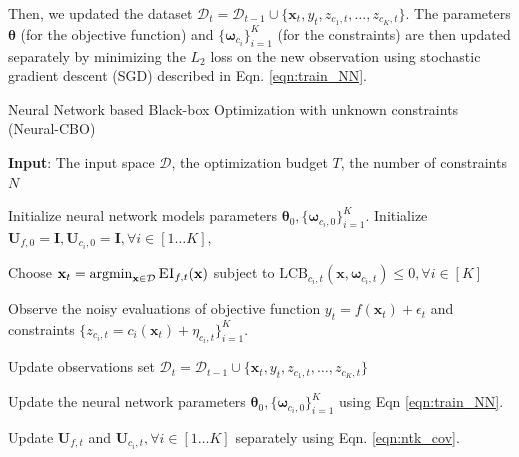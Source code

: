 Then, we updated the dataset $\mathcal{D}_t = \mathcal{D}_{t-1} \cup \{\mathbf{x}_t, y_t, z_{c_1,t}, \dots, z_{{c_K}, t}\}$. The parameters $\boldsymbol{\theta}$ (for the objective function) and $\{ \boldsymbol{\omega}_{c_i} \}_{i=1}^K$ (for the constraints) are then updated separately by minimizing the $L_2$ loss on the new observation using stochastic gradient descent (SGD) described in Eqn. \ref{eqn:train_NN}.


\begin{algorithm}[!ht]
\caption{Neural Network based Black-box Optimization with unknown constraints (Neural-CBO)}
\label{alg:neural_cbo}
\textbf{Input}: The input space $\mathcal D$, the optimization budget $T$, the number of constraints $N$
\begin{algorithmic}[1]
\State Initialize neural network models parameters $\boldsymbol{\theta}_0, \{ \boldsymbol{\omega}_{c_i,0} \}_{i=1}^K$.
\State Initialize $\mathbf{U}_{f,0} =   \mathbf{I}, \mathbf{U}_{c_i,0} =   \mathbf{I}, \forall i \in [1 \dots K]$,  

\State \parbox[t]{\dimexpr\linewidth-\algorithmicindent}{%
 Choose $\mathbf{x}_t = \operatorname*{argmin}_{\mathbf{x} \in \mathcal{D}} \textsc{EI}_{f,t}(\mathbf{x}) $ subject to $\text{LCB}_{c_i,t}(\mathbf{x}, \boldsymbol{\omega}_{c_i,t}) \le 0, \forall i \in [K]$ \label{alg:line_lcb_ei}
}
\State \parbox[t]{\dimexpr\linewidth-\algorithmicindent}{%
 Observe the noisy evaluations of objective function $y_t = f(\mathbf{x}_t) + \epsilon_t$ and constraints $\{ z_{c_i,t} = c_i(\mathbf{x}_t) + \eta_{c_i,t} \}_{i=1}^K$.
}
\State \parbox[t]{\dimexpr\linewidth-\algorithmicindent}{%
 Update observations set $\mathcal{D}_t = \mathcal{D}_{t-1} \cup \{\mathbf{x}_t, y_t, z_{c_1,t}, \dots, z_{{c_K}, t}\}$
}
\State \parbox[t]{\dimexpr\linewidth-\algorithmicindent}{%
 Update the neural network parameters $\boldsymbol{\theta}_0, \{ \boldsymbol{\omega}_{c_i,0} \}_{i=1}^K$ using Eqn \ref{eqn:train_NN}.
}
\State \parbox[t]{\dimexpr\linewidth-\algorithmicindent}{%
 Update $\mathbf{U}_{f,t}$ and $\mathbf{U}_{c_i,t}, \forall i \in [1 \dots K]$ separately using Eqn. \ref{eqn:ntk_cov}.
}
\EndFor

\end{algorithmic}
\end{algorithm}

